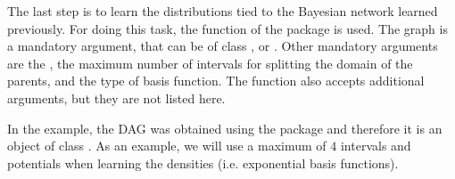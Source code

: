 The last step is to learn the distributions tied to the Bayesian network learned previously.
For doing this task, the  function of the  package is used.
The graph is a mandatory argument, that can be of class ,  or .
Other mandatory arguments are the , the maximum number of intervals for splitting the domain of the parents, 
 and the type of basis function. The function also accepts additional arguments, but they are not listed here.

In the example, the DAG was obtained using the  package and therefore it is
an object of class . As an example, 
we will use a maximum of $4$ intervals and  potentials when learning the densities (i.e. exponential
basis functions).


